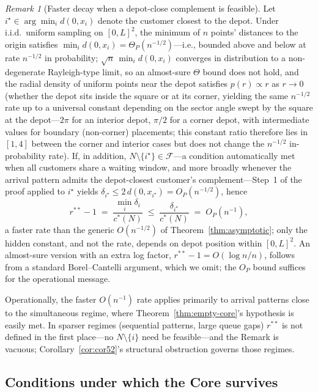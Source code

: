 \documentclass[11pt]{article}
\theoremstyle{plain}
\theoremstyle{definition}
\theoremstyle{remark}
\newtheorem{remark}[theorem]{Remark}
\newcommand{\F}{\mathcal{F}}
\newcommand{\cstar}{c^{\ast}}
\begin{document}
\begin{remark}[Faster decay when a depot-close complement is feasible]
\label{rem:asymptotic-tighter}
Let $i^{\star}\in\arg\min_i d(0,x_i)$ denote the customer closest to the depot. Under i.i.d.\ uniform sampling on $[0,L]^2$, the minimum of $n$ points' distances to the origin satisfies $\min_i d(0,x_i) = \Theta_P(n^{-1/2})$---i.e., bounded above and below at rate $n^{-1/2}$ in probability; $\sqrt{n}\,\min_i d(0,x_i)$ converges in distribution to a non-degenerate Rayleigh-type limit, so an almost-sure $\Theta$ bound does not hold, and the radial density of uniform points near the depot satisfies $p(r)\propto r$ as $r\to 0$ (whether the depot sits inside the square or at its corner, yielding the same $n^{-1/2}$ rate up to a universal constant depending on the sector angle swept by the square at the depot---$2\pi$ for an interior depot, $\pi/2$ for a corner depot, with intermediate values for boundary (non-corner) placements; this constant ratio therefore lies in $[1,4]$ between the corner and interior cases but does not change the $n^{-1/2}$ in-probability rate). If, in addition, $N\setminus\{i^{\star}\}\in\F$---a condition automatically met when all customers share a waiting window, and more broadly whenever the arrival pattern admits the depot-closest customer's complement---Step~1 of the proof applied to $i^{\star}$ yields $\delta_{i^{\star}} \le 2\,d(0,x_{i^{\star}}) = O_P(n^{-1/2})$, hence
\[
r^{\ast\ast}-1 \;=\; \frac{\min_i \delta_i}{\cstar(N)} \;\le\; \frac{\delta_{i^{\star}}}{\cstar(N)} \;=\; O_P(n^{-1}),
\]
a faster rate than the generic $O(n^{-1/2})$ of Theorem~\ref{thm:asymptotic}; only the hidden constant, and not the rate, depends on depot position within $[0,L]^2$. An almost-sure version with an extra log factor, $r^{\ast\ast}-1 = O(\log n / n)$, follows from a standard Borel--Cantelli argument, which we omit; the $O_P$ bound suffices for the operational message.

Operationally, the faster $O(n^{-1})$ rate applies primarily to arrival patterns close to the simultaneous regime, where Theorem~\ref{thm:empty-core}'s hypothesis is easily met. In sparser regimes (sequential patterns, large queue gaps) $r^{\ast\ast}$ is not defined in the first place---no $N\setminus\{i\}$ need be feasible---and the Remark is vacuous; Corollary~\ref{cor:cor52}'s structural obstruction governs those regimes.
\end{remark}

\subsection{Conditions under which the Core survives}
\label{ssec:survive}
\end{document}
